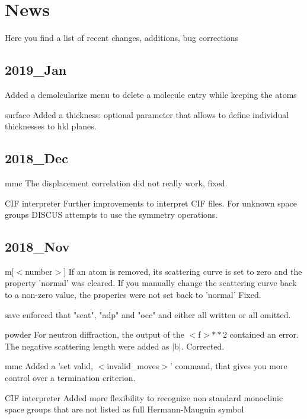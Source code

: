 \section{News}
\par
Here you find a list of recent changes, additions, bug corrections 
\subsection*{2019\_Jan}
\par
Added a demolcularize menu to delete a molecule entry while 
keeping the atoms 
\par
surface 
   Added a thickness: optional parameter that allows to define 
   individual thicknesses to hkl planes. 
\subsection*{2018\_Dec}
\par
mmc 
   The displacement correlation did not really work, fixed. 
\par
CIF interpreter 
   Further improvements to interpret CIF files. For unknown 
   space groups DISCUS attempts to use the symmetry operations. 
\subsection*{2018\_Nov}
\par
m[$ <$number$> $] 
   If an atom is removed, its scattering curve is set to zero and 
   the property 'normal' was cleared. 
   If you manually change the scattering curve back to a non-zero 
   value, the properies were not set back to 'normal' Fixed. 
\par
save 
   enforced that "scat", "adp" and "occ" and either all written 
   or all omitted. 
\par
powder 
   For neutron diffraction, the output of the $ <$f$> $$**$2 contained an 
   error. The negative scattering length were added as $| $b$| $. 
   Corrected. 
\par
mmc 
   Added a 'set valid, $ <$invalid\_moves$> $' command, that gives you more 
   control over a termination criterion. 
\par
CIF interpreter 
   Added more flexibility to recognize non standard monoclinic space 
   groups that are not listed as full Hermann-Mauguin symbol 
